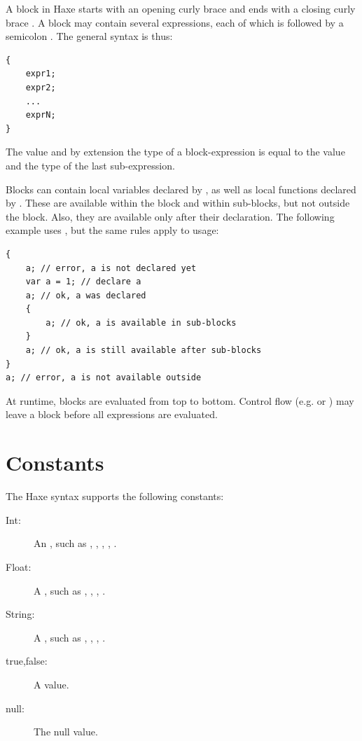 \documentclass{haxe}
\begin{document}
A block in Haxe starts with an opening curly brace \expr{\{} and ends with a closing curly brace \expr{\}}. A block may contain several expressions, each of which is followed by a semicolon \expr{;}. The general syntax is thus:

\begin{lstlisting}
{
	expr1;
	expr2;
	...
	exprN;
}
\end{lstlisting}
The value and by extension the type of a block-expression is equal to the value and the type of the last sub-expression.

Blocks can contain local variables declared by , as well as local functions declared by . These are available within the block and within sub-blocks, but not outside the block. Also, they are available only after their declaration. The following example uses , but the same rules apply to  usage:

\begin{lstlisting}
{
	a; // error, a is not declared yet
	var a = 1; // declare a
	a; // ok, a was declared
	{
		a; // ok, a is available in sub-blocks
	}
	a; // ok, a is still available after sub-blocks
}
a; // error, a is not available outside
\end{lstlisting}
At runtime, blocks are evaluated from top to bottom. Control flow (e.g.  or ) may leave a block before all expressions 
are evaluated.


\section{Constants}
\label{expression-constants}

The Haxe syntax supports the following constants:

\begin{description}
	\item[Int:] An , such as , , , , .
	\item[Float:] A , such as , , , .
	\item[String:] A , such as , , , .
	\item[true,false:] A  value.
	\item[null:] The null value.
\end{description}
\end{document}
